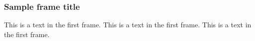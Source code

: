 \documentclass{beamer}
\begin{document}
\begin{frame}
\frametitle{Sample frame title}
This is a text in the first frame. This is a text in the first frame. This is a text in the first frame.
\end{frame}
\end{document}
